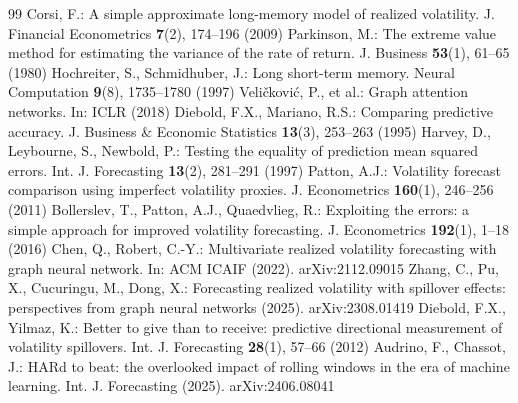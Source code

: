 \documentclass[runningheads]{llncs}
\begin{document}
\begin{thebibliography}{99}
 Corsi, F.: A simple approximate long-memory model of realized volatility. J. Financial Econometrics \textbf{7}(2), 174--196 (2009)
 Parkinson, M.: The extreme value method for estimating the variance of the rate of return. J. Business \textbf{53}(1), 61--65 (1980)
 Hochreiter, S., Schmidhuber, J.: Long short-term memory. Neural Computation \textbf{9}(8), 1735--1780 (1997)
 Veli\v{c}kovi\'c, P., et al.: Graph attention networks. In: ICLR (2018)
 Diebold, F.X., Mariano, R.S.: Comparing predictive accuracy. J. Business \& Economic Statistics \textbf{13}(3), 253--263 (1995)
 Harvey, D., Leybourne, S., Newbold, P.: Testing the equality of prediction mean squared errors. Int. J. Forecasting \textbf{13}(2), 281--291 (1997)
 Patton, A.J.: Volatility forecast comparison using imperfect volatility proxies. J. Econometrics \textbf{160}(1), 246--256 (2011)
 Bollerslev, T., Patton, A.J., Quaedvlieg, R.: Exploiting the errors: a simple approach for improved volatility forecasting. J. Econometrics \textbf{192}(1), 1--18 (2016)
 Chen, Q., Robert, C.-Y.: Multivariate realized volatility forecasting with graph neural network. In: ACM ICAIF (2022). arXiv:2112.09015
 Zhang, C., Pu, X., Cucuringu, M., Dong, X.: Forecasting realized volatility with spillover effects: perspectives from graph neural networks (2025). arXiv:2308.01419
 Diebold, F.X., Yilmaz, K.: Better to give than to receive: predictive directional measurement of volatility spillovers. Int. J. Forecasting \textbf{28}(1), 57--66 (2012)
 Audrino, F., Chassot, J.: HARd to beat: the overlooked impact of rolling windows in the era of machine learning. Int. J. Forecasting (2025). arXiv:2406.08041
\end{thebibliography}
\end{document}

